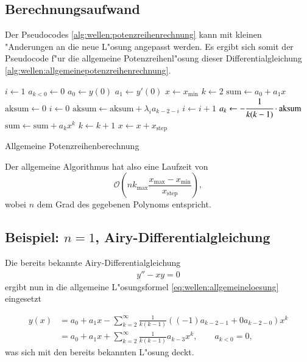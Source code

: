 \subsection{Berechnungsaufwand}
Der Pseudocodes \ref{alg:wellen:potenzreihenrechnung} kann mit kleinen 
"Anderungen an die neue L"osung angepasst werden. Es ergibt sich somit der 
Pseudocode f"ur die allgemeine Potenzreihenl"osung dieser Differentialgleichung 
\ref{alg:wellen:allgemeinepotenzreihenrechnung}.

\begin{algorithm}
	\begin{algorithmic}[1]
		\State $i \gets 1$
		\State $a_{k<0} \gets 0$
		\State $a_0 \gets y(0)$
		\State $a_1 \gets y'(0)$
		\State $x \gets x_{\text{min}}$
			\State $k \gets 2$
			\State $\text{sum} \gets a_0 + a_1x$
				\State $\text{aksum} \gets 0$
				\State $i \gets 0$
					\State $\text{aksum} \gets \text{aksum}+\lambda_i a_{k-2-i}$
					\State $i \gets i + 1$
				\EndFor
				\State $a_k \gets -\cfrac{1}{k(k-1)} \cdot \text{aksum}$
				\State $\text{sum} \gets \text{sum} + a_k x^k$
				\State $k \gets k + 1$
			\EndFor
			\State $x \gets x + x_{\text{step}}$
		\EndFor
	\end{algorithmic}
	\caption{Allgemeine Potenzreihenberechnung} 
	\label{alg:wellen:allgemeinepotenzreihenrechnung}
\end{algorithm}

Der allgemeine Algorithmus hat also eine Laufzeit von
\begin{equation*}
\mathcal{O}\left(nk_{\text{max}}\frac{x_{\text{max}}-x_{\text{min}}} 
{x_{\text{step}}}\right),
\end{equation*}
wobei $n$ dem Grad des gegebenen Polynoms entspricht.

\subsection{Beispiel: \texorpdfstring{$n = 1$}{n = 1}, 
Airy-Differentialgleichung}
Die bereits bekannte Airy-Differentialgleichung
\begin{align*}
	y''-xy = 0
\end{align*}
ergibt nun in die allgemeine L"osungsformel \ref{eq:wellen:allgemeineloesung} 
eingesetzt

\begin{equation*}
\begin{split}
	y(x) &= a_0+a_1x-\sum_{k=2}^{\infty} \frac{1}{k(k-1)} ((-1) a_{k-2-1} + 0 
	a_{k-2-0}) x^k
	\\
	&= a_0+a_1x+\sum_{k=2}^{\infty} \frac{1}{k(k-1)} a_{k-3} x^k,
	\qquad a_{k < 0} = 0,
\end{split}
\end{equation*}
was sich mit den bereits bekannten L"osung deckt.

